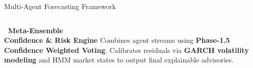 \documentclass{beamer}
\begin{document}
\begin{frame}{Multi-Agent Forecasting Framework}
\begin{tcolorbox}[enhanced, colback=accentTeal!4, colframe=accentTeal!40, boxrule=0.4pt,
  arc=4pt, width=0.98\textwidth, left=6pt, right=6pt, top=2.5pt, bottom=2.5pt, boxsep=0pt,
  shadow={0.5pt}{-0.5pt}{0pt}{black!8}]
    \begin{columns}[c]
        \centering
        \textbf{\textcolor{primaryDark}{\small {}~Meta-Ensemble}}\\
        {\fontsize{5pt}{6pt}\selectfont\color{primaryDark!80}\bfseries Confidence \& Risk Engine}
        \fontsize{5.5pt}{6.5pt}\selectfont
        Combines agent streams using \textbf{Phase-1.5 Confidence Weighted Voting}. Calibrates residuals via \textbf{GARCH volatility modeling} and HMM market states to output final explainable advisories.
    \end{columns}
\end{tcolorbox}
\end{frame}
\end{document}
